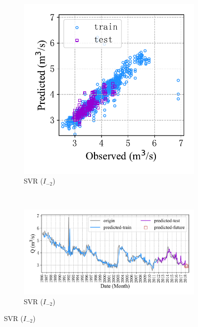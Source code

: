\begin{figure}[!htbp]
\begin{subfigure}[b]{0.615\textwidth}
  \end{subfigure}
  \\
  \begin{subfigure}[b]{0.305\textwidth}
    \includegraphics[width=\textwidth]{Img/chap4_spr/out3/spr_scatter_in_2_out_3_svr.pdf}
    \vspace{-1.2cm}
    \caption{SVR ($I_{-2}$)}
    \label{fig:spr_scatter_in_2_out_3_svr}
  \end{subfigure}
  ~
  \begin{subfigure}[b]{0.615\textwidth}
    \includegraphics[width=\textwidth]{Img/chap4_spr/out3/spr_series_in_2_out_3_svr.pdf}
    \vspace{-1.2cm}
    \caption{SVR ($I_{-2}$)}
    \label{fig:spr_series_in_2_out_3_svr}

\end{subfigure}
\end{figure}
